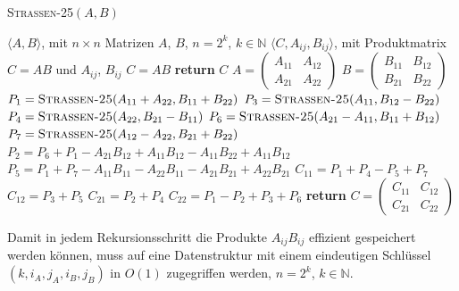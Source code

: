 \documentclass{scrartcl}
\begin{document}
\begin{algorithm}
	\caption{\textsc{Strassen-25}$(A, B)$}
	\label{alg:strassen25}
	\begin{algorithmic}[1]
		\Require $\langle A, B \rangle$, mit $n \times n$ Matrizen $A$, $B$, $n = 2^k$, $k \in \mathbb{N}$
		\Ensure $\langle C, A_{ij}, B_{ij} \rangle$, mit Produktmatrix $C = AB$ und $A_{ij}$, $B_{ij}$
		 $C = AB$ %
		\State \textbf{return} $C$
		\EndIf
		\State $A = \begin{pmatrix} A_{11} & A_{12} \\ A_{21} & A_{22} \end{pmatrix}$
		\State $B = \begin{pmatrix} B_{11} & B_{12} \\ B_{21} & B_{22} \end{pmatrix}$
		\State $P_1 = \textsc{Strassen-25}(A_{11} + A_{22}, B_{11} + B_{22})$
		\State $P_3 = \textsc{Strassen-25}(A_{11}, B_{12} - B_{22})$
		\State $P_4 = \textsc{Strassen-25}(A_{22}, B_{21} - B_{11})$
		\State $P_6 = \textsc{Strassen-25}(A_{21} - A_{11}, B_{11} + B_{12})$
		\State $P_7 = \textsc{Strassen-25}(A_{12} - A_{22}, B_{21} + B_{22})$
		\State $P_2 = P_6 + P_1 - A_{21}B_{12} + A_{11}B_{12} - A_{11}B_{22} + A_{11}B_{12}$ 
		\State $P_5 = P_1 + P_7 - A_{11}B_{11} - A_{22}B_{11} - A_{21}B_{21} + A_{22}B_{21}$
		\State $C_{11} = P_1 + P_4 - P_5 + P_7$
		\State $C_{12} = P_3 + P_5$
		\State $C_{21} = P_2 + P_4$
		\State $C_{22} = P_1 - P_2 + P_3 + P_6$
		\State \textbf{return} $C = \begin{pmatrix} C_{11} & C_{12} \\ C_{21} & C_{22} \end{pmatrix}$
	\end{algorithmic}
\end{algorithm}
Damit in jedem Rekursionsschritt die Produkte $A_{ij}B_{ij}$ effizient gespeichert werden können, muss auf eine Datenstruktur mit einem eindeutigen Schlüssel $(k, i_{A}, j_{A}, i_{B}, j_{B})$ in $O(1)$ zugegriffen werden, $n = 2^k$, $k \in \mathbb{N}$.
\end{document}
